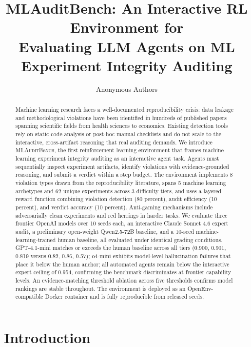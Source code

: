 \documentclass{article}
\title{\textbf{MLAuditBench}: An Interactive RL Environment for\\
Evaluating LLM Agents on ML Experiment Integrity Auditing}
\author{Anonymous Authors}
\begin{document}
\maketitle

\begin{abstract}
Machine learning research faces a well-documented reproducibility crisis:
data leakage and methodological violations have been identified in hundreds
of published papers spanning scientific fields from health sciences to
economics. Existing detection tools rely on static code analysis or
post-hoc manual checklists and do not scale to the interactive,
cross-artifact reasoning that real auditing demands. We introduce
\textsc{MLAuditBench}, the first reinforcement learning environment that
frames machine learning experiment integrity auditing as an interactive
agent task. Agents must sequentially inspect experiment artifacts,
identify violations with evidence-grounded reasoning, and submit a
verdict within a step budget. The environment implements 8 violation
types drawn from the reproducibility literature, spans 5 machine
learning archetypes and 62 unique experiments across 3 difficulty tiers,
and uses a layered reward function combining violation detection
(80 percent), audit efficiency (10 percent), and verdict accuracy
(10 percent). Anti-gaming mechanisms include adversarially clean
experiments and red herrings in harder tasks. We evaluate three frontier
OpenAI models over 10 seeds each, an interactive Claude Sonnet 4.6
expert audit, a preliminary open-weight Qwen2.5-72B baseline, and a
10-seed machine-learning-trained human baseline, all evaluated under
identical grading conditions. GPT-4.1-mini matches or exceeds the human
baseline across all tiers (0.900, 0.901, 0.819 versus 0.82, 0.86, 0.57);
o4-mini exhibits model-level hallucination failures that place it below
the human anchor; all automated agents remain below the interactive
expert ceiling of 0.954, confirming the benchmark discriminates at
frontier capability levels. An evidence-matching threshold ablation
across five thresholds confirms model rankings are stable throughout.
The environment is deployed as an OpenEnv-compatible Docker container
and is fully reproducible from released seeds.
\end{abstract}

\section{Introduction}
\label{sec:intro}
\end{document}

